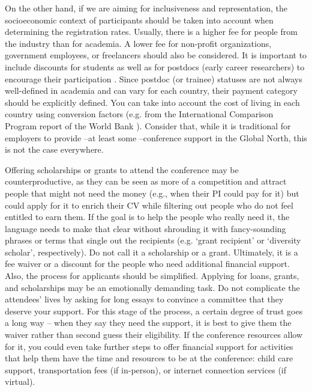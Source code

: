 \documentclass[10pt,letterpaper]{article}
\begin{document}
On the other hand, if we are aiming for inclusiveness and representation, the socioeconomic context of participants should be taken into account when determining the registration rates. Usually, there is a higher fee for people from the industry than for academia. A lower fee for non-profit organizations, government employees, or freelancers should also be considered. It is important to include discounts for students as well as for postdocs (early career researchers) to encourage their participation \cite{sarabipourChangingScientificMeetings2021, andalibPostdocQueueLabour2018, kaplanPostdocNot2012}. Since postdoc (or trainee) statuses are not always well-defined in academia and can vary for each country, their payment category should be explicitly defined. You can take into account the cost of living in each country using conversion factors (e.g. from the International Comparison Program report of the World Bank \cite{arendDisparityConferenceRegistration2019}). Consider that, while it is traditional for employers to provide --at least some --conference support in the Global North, this is not the case everywhere. 



Offering scholarships or grants to attend the conference may be counterproductive, as they can be seen as more of a competition and attract people that might not need the money (e.g., when their PI could pay for it) but could apply for it to enrich their CV while filtering out people who do not feel entitled to earn them. If the goal is to help the people who really need it, the language needs to make that clear without shrouding it with fancy-sounding phrases or terms that single out the recipients (e.g. `grant recipient' or `diversity scholar', respectively). Do not call it a scholarship or a grant. Ultimately, it is a fee waiver or a discount for the people who need additional financial support. Also, the process for applicants should be simplified. Applying for loans, grants, and scholarships may be an emotionally demanding task. Do not complicate the attendees' lives by asking for long essays to convince a committee that they deserve your support. For this stage of the process, a certain degree of trust goes a long way -- when they say they need the support, it is best to give them the waiver rather than second guess their eligibility. If the conference resources allow for it, you could even take further steps to offer financial support for activities that help them have the time and resources to be at the conference: child care support, transportation fees (if in-person), or internet connection services (if virtual). 
\end{document}
